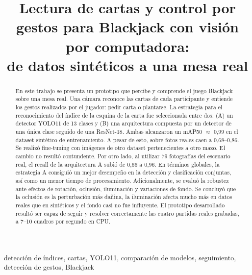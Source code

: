 \documentclass[conference,a4paper]{IEEEtran}
\begin{document}
\title{Lectura de cartas y control por gestos para Blackjack con visión por computadora:\\
de datos sintéticos a una mesa real}

\author{
}

\maketitle

\begin{abstract}
En este trabajo se presenta un prototipo que percibe y comprende el juego Blackjack sobre una mesa real. Una cámara reconoce las cartas de cada participante y entiende los gestos realizados por el jugador: pedir carta o plantarse. La estrategia para el reconocimiento del índice de la esquina de la carta fue seleccionada entre dos: (A) un detector YOLO11 de 13 clases y (B) una arquitectura compuesta por un detector de una única clase seguido de una ResNet-18. Ambas alcanzaron un mAP50 $\approx$ 0,99 en el dataset sintético de entrenamiento. A pesar de esto, sobre fotos reales caen a 0,68–0,86. Se realizó fine-tuning con imágenes de otro dataset pertenecientes a otro mazo. El cambio no resultó contundente. Por otro lado, al utilizar 79 fotografías del escenario real, el recall de la arquitectura A subió de 0,66 a 0,96. En términos globales, la estrategia A consiguió un mejor desempeño en la detección y clasificación conjuntas, así como un menor tiempo de procesamiento. Adicionalmente, se evaluó la robustez ante efectos de rotación, oclusión, iluminación y variaciones de fondo. Se concluyó que la oclusión es la perturbación más dañina, la iluminación afecta mucho más en datos reales que en sintéticos y el fondo casi no fue influyente. El prototipo desarrollado resultó ser capaz de seguir y resolver correctamente las cuatro partidas reales grabadas, a 7--10 cuadros por segundo en CPU.

\end{abstract}

\begin{IEEEkeywords}
detección de índices, cartas, YOLO11, comparación de modelos, seguimiento, detección de gestos, Blackjack
\end{IEEEkeywords}
\end{document}
